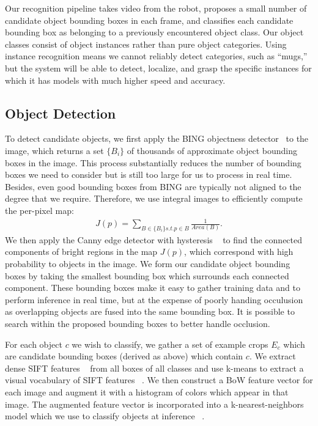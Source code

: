 \documentclass[conference]{IEEEtran}
\begin{document}
Our recognition pipeline takes video from the robot, proposes a small
number of candidate object bounding boxes in each frame, and
classifies each candidate bounding box as belonging to a previously
encountered object class. Our object classes consist of object
instances rather than pure object categories.  Using instance
recognition means we cannot reliably detect categories, such as
``mugs,'' but the system will be able to detect, localize, and grasp
the specific instances for which it has models with much higher speed
and accuracy.

\subsection{Object Detection}

To detect candidate objects, we first apply the BING objectness
detector~\citep{cheng14} to the image, which returns a set $\{B_i\}$
of thousands of approximate object bounding boxes in the image. This
process substantially reduces the number of bounding boxes we need to
consider but is still too large for us to process in real
time. Besides, even good bounding boxes from BING are typically not
aligned to the degree that we require. Therefore, we use integral
images to efficiently compute the per-pixel map:
\begin{align}
J(p) = \sum_{B \in \{B_i\} s.t. p \in B} \frac{1}{Area(B)}.
\end{align}
We then apply the Canny edge detector with hysteresis ~\citep{} to
find the connected components of bright regions in the map $J(p)$,
which correspond with high probability to objects in the image. We
form our candidate object bounding boxes by taking the smallest
bounding box which surrounds each connected component.  These bounding
boxes make it easy to gather training data and to perform inference in
real time, but at the expense of poorly handing occulusion as
overlapping objects are fused into the same bounding box.  It is
possible to search within the proposed bounding boxes to better handle
occlusion.

For each object $c$ we wish to classify, we gather a set of example
crops $E_c$ which are candidate bounding boxes (derived as above)
which contain $c$. We extract dense SIFT features ~\citep{} from all
boxes of all classes and use k-means to extract a visual vocabulary of
SIFT features ~\citep{}. We then construct a BoW feature vector for
each image and augment it with a histogram of colors which appear in
that image.  The augmented feature vector is incorporated into a
k-nearest-neighbors model which we use to classify objects at
inference ~\citep{}.
\end{document}
